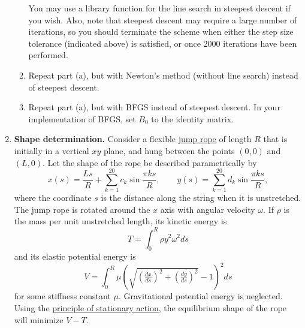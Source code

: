 \documentclass[11pt]{article}
\begin{document}
\begin{enumerate}
\begin{enumerate}
	You may use a library function for the line search in steepest descent
	if you wish. Also, note that steepest descent may require a large
	number of iterations, so you should terminate the scheme when either
	the step size tolerance (indicated above) is satisfied, or once
	2000 iterations have been performed.
      \item Repeat part (a), but with Newton's method (without line search)
	instead of steepest descent.
      \item Repeat part (a), but with BFGS instead of steepest descent. In your
	implementation of BFGS, set $B_0$ to the identity matrix.
    \end{enumerate}
  \item \textbf{Shape determination.} Consider a flexible
    \href{http://en.wikipedia.org/wiki/Skipping_rope}{jump rope} of length $R$
    that is initially in a vertical $xy$ plane, and hung between the points
    $(0,0)$ and $(L,0)$. Let the shape of the rope be described parametrically
    by
    \begin{equation}
      x(s) = \frac{Ls}{R} + \sum_{k=1}^{20} c_k \sin \frac{\pi k s}{R}, \qquad y(s) = \sum_{k=1}^{20} d_k \sin \frac{\pi k s}{R},
    \end{equation}
    where the coordinate $s$ is the distance along the string when it is
    unstretched. The jump rope is rotated around the $x$ axis with angular
    velocity $\omega$. If $\rho$ is the mass per unit unstretched length, its
    kinetic energy is
    \begin{equation}
      T= \int_0^R \rho y^2 \omega^2 ds
      \label{eq:kine}
    \end{equation}
    and its elastic potential energy is
    \begin{equation}
      V= \int_0^R \mu \left(\sqrt{\left(\tfrac{dx}{ds}\right)^2 + \left(\tfrac{dy}{ds}\right)^2}-1\right)^2 ds
      \label{eq:elae}
    \end{equation}
    for some stiffness constant $\mu$. Gravitational potential energy is
    neglected. Using the
    \href{http://en.wikipedia.org/wiki/Principle_of_least_action}{principle of
    stationary action}, the equilibrium shape of the rope will minimize $V-T$.


\end{enumerate}
\end{document}

